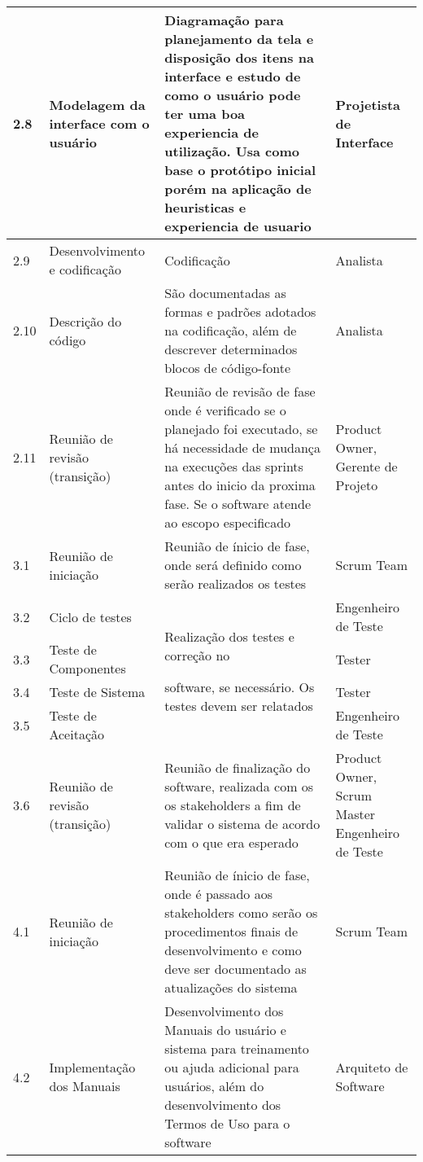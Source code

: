 \begin{longtable}[c]{|p{1.89em}|p{7.835em}|p{18.22em}|p{6.835em}|}
    \midrule
    2.8   & Modelagem da interface com o usuário & Diagramação para planejamento da tela e disposição dos itens na interface e estudo de como o usuário pode ter uma boa experiencia de utilização. Usa como base o protótipo inicial porém na aplicação de heuristicas e experiencia de usuario & Projetista de Interface \\
    \midrule
    2.9   & Desenvolvimento e codificação & Codificação & Analista \\
    \midrule
    2.10  & Descrição do código & São documentadas as formas e padrões adotados na codificação, além de descrever determinados blocos de código-fonte & Analista \\
    \midrule
    2.11  & Reunião de revisão (transição) & Reunião de revisão de fase onde é verificado se o planejado foi executado, se há necessidade de mudança na execuções das sprints antes do inicio da proxima fase. Se o software atende ao escopo especificado & Product Owner, Gerente de Projeto \\
    \midrule
    3.1   & Reunião de iniciação & Reunião de ínicio de fase, onde será definido como serão realizados os testes & Scrum Team \\
    \midrule
    3.2   & Ciclo de testes & \multirow{4}[8]{*}{\par Realização dos testes e correção no \par software, se necessário. Os testes devem ser relatados} & Engenheiro de Teste \\
\cmidrule{1-2}\cmidrule{4-4}    3.3   & Teste de Componentes & \multicolumn{1}{c|}{} & Tester \\
\cmidrule{1-2}\cmidrule{4-4}    3.4   & Teste de Sistema & \multicolumn{1}{c|}{} & Tester \\
\cmidrule{1-2}\cmidrule{4-4}    3.5   & Teste de Aceitação & \multicolumn{1}{c|}{} & Engenheiro de Teste \\
    \midrule
    3.6   & Reunião de revisão (transição) & Reunião de finalização do software, realizada com os os stakeholders a fim de validar o sistema de acordo com o que era esperado & Product Owner, Scrum Master Engenheiro de Teste \\
    \midrule
    4.1   & Reunião de iniciação & Reunião de ínicio de fase, onde é passado aos stakeholders como serão os procedimentos finais de desenvolvimento e como deve ser documentado as atualizações do sistema & Scrum Team \\
    \midrule
    4.2   & Implementação dos Manuais & Desenvolvimento dos Manuais do usuário e sistema para treinamento ou ajuda adicional para usuários, além do desenvolvimento dos Termos de Uso para o software & Arquiteto de Software \\

\end{longtable}
